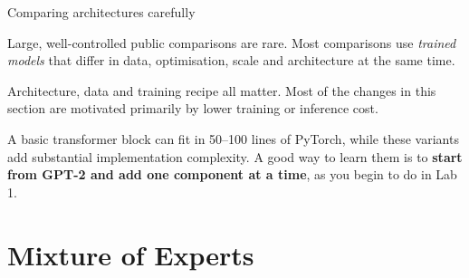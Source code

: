 \documentclass[aspectratio=169,10pt]{beamer}
\begin{document}
\begin{frame}{Comparing architectures carefully}
  \begin{gotcha}
    Large, well-controlled public comparisons are rare. Most comparisons use
    \emph{trained models} that differ in data, optimisation, scale and
    architecture at the same time.
  \end{gotcha}
  \vspace{0.6em}
  \begin{takeaway}
    Architecture, data and training recipe all matter. Most of the changes in
    this section are motivated primarily by lower training or inference cost.
  \end{takeaway}
  \vspace{0.6em}
  \small
  A basic transformer block can fit in 50--100 lines of PyTorch, while these
  variants add substantial implementation complexity. A good way to learn
  them is to \textbf{start from GPT-2 and add one component at a time}, as you
  begin to do in Lab 1.
\end{frame}

\section{Mixture of Experts}
\end{document}
